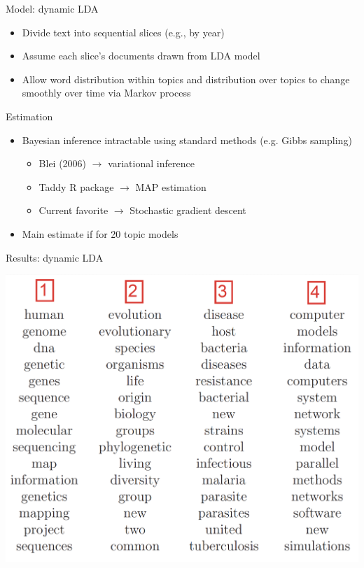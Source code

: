 \documentclass[english]{beamer}
\begin{document}
\begin{frame}{Model: dynamic LDA}
\begin{itemize}
\setlength{\itemsep}{1em}
    \item Divide text into sequential slices (e.g., by year)
    \item Assume each slice's documents drawn from LDA model
    \item Allow word distribution within topics and distribution over topics to change smoothly over time via Markov process
\end{itemize}
\end{frame}

\begin{frame}{Estimation}
\begin{itemize}
\setlength{\itemsep}{1em}
    \item Bayesian inference intractable using standard methods (e.g. Gibbs sampling)
    \vspace{6pt}
    \begin{itemize}
    \setlength{\itemsep}{0.6em}
        \item Blei (2006) $\rightarrow$ variational inference
        \item Taddy R package $\rightarrow$ MAP estimation
        \item Current favorite $\rightarrow$ Stochastic gradient descent
    \end{itemize}
    \item Main estimate if for 20 topic models
\end{itemize}
    
\end{frame}

\begin{frame}{Results: dynamic LDA}
\begin{center}
\includegraphics[width=0.9 \textwidth]{Images/topics_output.png}
\end{center}
\end{frame}
\end{document}
